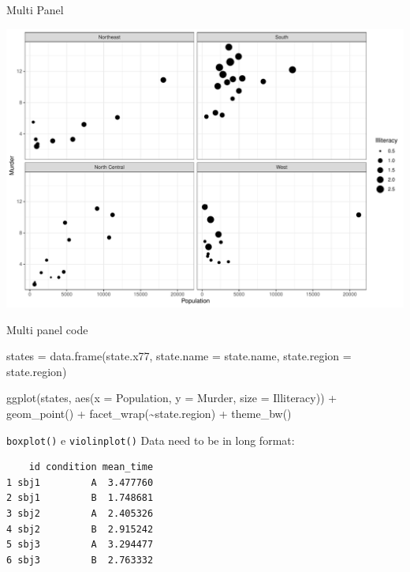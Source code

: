 \documentclass[
  ignorenonframetext,
]{beamer}
\newenvironment{Shaded}{\begin{snugshade}}{\end{snugshade}}
\newcommand{\AttributeTok}[1]{\textcolor[rgb]{0.00,0.34,0.68}{#1}}
\newcommand{\FunctionTok}[1]{\textcolor[rgb]{0.39,0.29,0.61}{#1}}
\newcommand{\NormalTok}[1]{\textcolor[rgb]{0.12,0.11,0.11}{#1}}
\newcommand{\OtherTok}[1]{\textcolor[rgb]{0.00,0.43,0.16}{#1}}
\newcommand{\SpecialCharTok}[1]{\textcolor[rgb]{0.24,0.68,0.91}{#1}}
\begin{document}
\begin{frame}{Multi Panel}
\protect\hypertarget{multi-panel}{}
\begin{center}\includegraphics[width=0.8\linewidth]{Practice_files/figure-beamer/unnamed-chunk-72-1} \end{center}
\end{frame}

\begin{frame}[fragile]{Multi panel code}
\protect\hypertarget{multi-panel-code}{}
\begin{Shaded}
\begin{Highlighting}[]
\NormalTok{states }\OtherTok{=} \FunctionTok{data.frame}\NormalTok{(state.x77, }\AttributeTok{state.name =}\NormalTok{ state.name,}
                    \AttributeTok{state.region =}\NormalTok{ state.region)}

\FunctionTok{ggplot}\NormalTok{(states, }
       \FunctionTok{aes}\NormalTok{(}\AttributeTok{x =}\NormalTok{ Population, }\AttributeTok{y =}\NormalTok{ Murder, }
           \AttributeTok{size =}\NormalTok{ Illiteracy)) }\SpecialCharTok{+} \FunctionTok{geom\_point}\NormalTok{() }\SpecialCharTok{+}
  \FunctionTok{facet\_wrap}\NormalTok{(}\SpecialCharTok{\textasciitilde{}}\NormalTok{state.region) }\SpecialCharTok{+} \FunctionTok{theme\_bw}\NormalTok{() }
\end{Highlighting}
\end{Shaded}
\end{frame}

\begin{frame}[fragile]{\texttt{boxplot()} e \texttt{violinplot()}}
\protect\hypertarget{boxplot-e-violinplot}{}
Data need to be in long format:

\begin{verbatim}
    id condition mean_time
1 sbj1         A  3.477760
2 sbj1         B  1.748681
3 sbj2         A  2.405326
4 sbj2         B  2.915242
5 sbj3         A  3.294477
6 sbj3         B  2.763332
\end{verbatim}
\end{frame}
\end{document}
